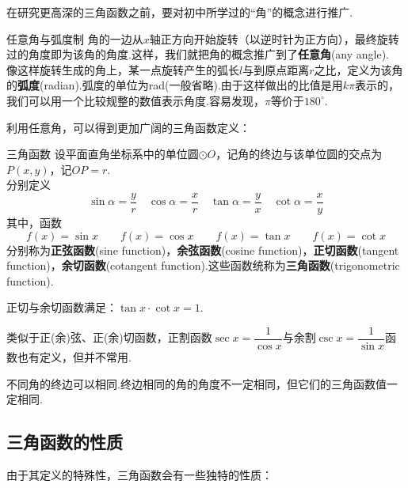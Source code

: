\documentclass[lang=cn, zihao=5]{elegantbook}
\begin{document}
在研究更高深的三角函数之前，要对初中所学过的“角”的概念进行推广.

\begin{definition}{任意角与弧度制} %
    角的一边从$x$轴正方向开始旋转（以逆时针为正方向），最终旋转过的角度即为该角的角度.这样，我们就把角的概念推广到了\textbf{任意角}(any angle).\\
    像这样旋转生成的角上，某一点旋转产生的弧长$l$与到原点距离$r$之比，定义为该角的\textbf{弧度}(radian).弧度的单位为rad(一般省略).由于这样做出的比值是用$k \pi$表示的，我们可以用一个比较规整的数值表示角度.容易发现，$\pi$等价于$180^{\circ}$.
\end{definition}

利用任意角，可以得到更加广阔的三角函数定义：

\begin{definition}{三角函数} %
    设平面直角坐标系中的单位圆$\odot O$，记角的终边与该单位圆的交点为$P(x,y)$，记$OP=r$.\\
    分别定义$$\sin{\alpha}=\frac{y}{r} \quad \cos{\alpha}=\frac{x}{r} \quad \tan{\alpha}=\frac{y}{x} \quad \cot{\alpha}=\frac{x}{y}$$
    其中，函数$$f(x)=\sin{x} \qquad f(x)=\cos{x} \qquad f(x)=\tan{x} \qquad f(x)=\cot{x}$$
    分别称为\textbf{正弦函数}(sine function)，\textbf{余弦函数}(cosine function)，\textbf{正切函数}(tangent function)，\textbf{余切函数}(cotangent function).这些函数统称为\textbf{三角函数}(trigonometric function).
\end{definition}
\begin{remark}
    正切与余切函数满足：$\tan{x} \cdot \cot{x} = 1$.
\end{remark}
\begin{remark}
    类似于正(余)弦、正(余)切函数，正割函数$\sec{x}=\dfrac{1}{\cos{x}}$与余割$\csc{x}=\dfrac{1}{\sin{x}}$函数也有定义，但并不常用.
\end{remark}
\begin{remark}
    不同角的终边可以相同.终边相同的角的角度不一定相同，但它们的三角函数值一定相同.
\end{remark}


\subsection{三角函数的性质}

由于其定义的特殊性，三角函数会有一些独特的性质：
\end{document}

